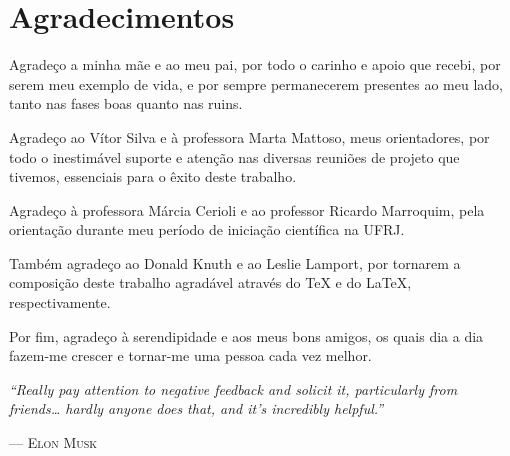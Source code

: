 
\dedication{Dedico este trabalho aos meus pais.}

\chapter*{Agradecimentos}

Agradeço a minha mãe e ao meu pai, por todo o carinho e apoio que recebi, por serem meu exemplo de vida, e por sempre permanecerem presentes ao meu lado, tanto nas fases boas quanto nas ruins.

Agradeço ao Vítor Silva e à professora Marta Mattoso, meus orientadores, por todo o inestimável suporte e atenção nas diversas reuniões de projeto que tivemos, essenciais para o êxito deste trabalho.

Agradeço à professora Márcia Cerioli e ao professor Ricardo Marroquim, pela orientação durante meu período de iniciação científica na UFRJ.

Também agradeço ao Donald Knuth e ao Leslie Lamport, por tornarem a composição deste trabalho agradável através do \TeX{} e do \LaTeX{}, respectivamente.

Por fim, agradeço à serendipidade e aos meus bons amigos, os quais dia a dia fazem-me crescer e tornar-me uma pessoa cada vez melhor.

\begin{center}
\end{center}

\vfill{}

\epigraph{\textit{``Really pay attention to negative feedback and solicit it, particularly from friends\ldots{} hardly anyone does that, and it's incredibly helpful.''}}{--- \textsc{Elon Musk}}
